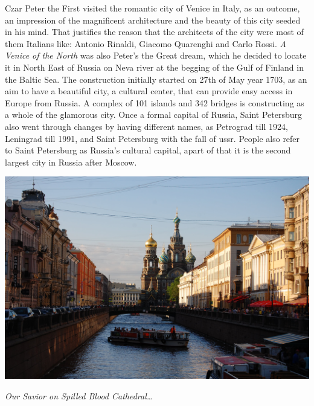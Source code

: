 \documentclass[10pt,a4paper]{article} %
\begin{document}
\begin{multicols}{3}
Czar Peter the First visited the romantic city of Venice in Italy, as an outcome, 
an impression of the magnificent architecture and the beauty of this city 
seeded in his mind. 
That justifies the reason that the architects of the city were most of them Italians 
like: Antonio Rinaldi, Giacomo Quarenghi and Carlo Rossi. 
\textit{A Venice of the North} was also Peter's the Great dream, 
which he decided to locate it in North East of Russia on Neva river 
at the begging of the Gulf of Finland in the Baltic Sea. 
The construction initially started on 27th of May year 1703, 
as an aim to have a beautiful city, a cultural center, 
that can provide easy access in Europe from Russia. 
A complex of 101 islands and 342 bridges is constructing as a whole of the glamorous city. 
Once a formal capital of Russia, Saint Petersburg also went through 
changes by having different names, as Petrograd till 1924, Leningrad till 1991, 
and Saint Petersburg with the fall of {\sc ussr}. 
People also refer to Saint Petersburg as Russia's cultural capital, 
apart of that it is the second largest city in Russia after Moscow.

\end{multicols} %

\begin{center}
\vspace{10pt}
\includegraphics[width=0.8\linewidth]{media/main_picture.jpg} %
\par\large\textit{Our Savior on Spilled Blood Cathedral\ldots}
\vspace{10pt}
\end{center}
\end{document}
